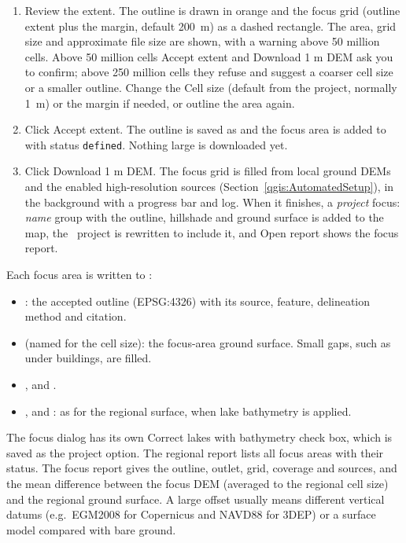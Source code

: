 \begin{enumerate}
\begin{itemize}
                The watershed is merged with the feature, because a wetland or lake often extends beyond the watershed of its outlet.
            \end{itemize}
        \item Review the extent.  The outline is drawn in orange and the focus grid (outline extent plus the margin, default 200~m) as a dashed rectangle.  The area, grid size and approximate file size are shown, with a warning above 50 million cells.  Above 50 million cells {\sf Accept extent} and {\sf Download 1 m DEM} ask you to confirm; above 250 million cells they refuse and suggest a coarser cell size or a smaller outline.  Change the {\sf Cell size} (default from the project, normally 1~m) or the margin if needed, or outline the area again.
        \item Click {\sf Accept extent}.  The outline is saved as  and the focus area is added to  with status {\tt defined}.  Nothing large is downloaded yet.
        \item Click {\sf Download 1 m DEM}.  The focus grid is filled from local ground DEMs and the enabled high-resolution sources (Section~\ref{qgis:AutomatedSetup}), in the background with a progress bar and log.  When it finishes, a {\sf \textit{project} focus: \textit{name}} group with the outline, hillshade and ground surface is added to the map, the \qgis\ project  is rewritten to include it, and {\sf Open report} shows the focus report.
        \end{enumerate}

        Each focus area is written to :
        \begin{itemize}
        \item {}: the accepted outline (EPSG:4326) with its source, feature, delineation method and citation.
        \item {} (named for the cell size): the focus-area ground surface.  Small gaps, such as under buildings, are filled.
        \item {},  and .
        \item {},  and : as for the regional surface, when lake bathymetry is applied.
        \end{itemize}
        The focus dialog has its own {\sf Correct lakes with bathymetry} check box, which is saved as the project option.
        The regional report lists all focus areas with their status.  The focus report gives the outline, outlet, grid, coverage and sources, and the mean difference between the focus DEM (averaged to the regional cell size) and the regional ground surface.  A large offset usually means different vertical datums (e.g.\ EGM2008 for Copernicus and NAVD88 for 3DEP) or a surface model compared with bare ground.

